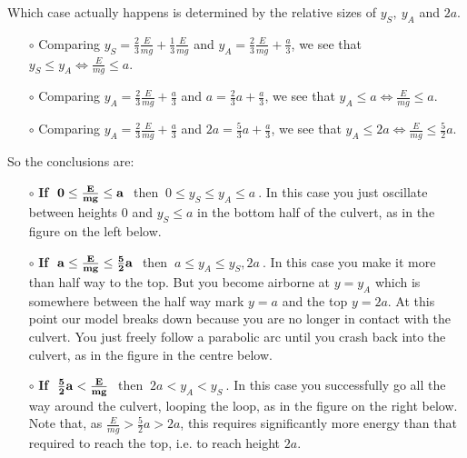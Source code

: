 Which case actually happens is determined by the relative sizes of $y_S,\ y_A$ and $2a$.
\begin{itemize}\itemsep1pt \parskip0pt  %
\item[$\circ$]
Comparing 
$y_S=\frac{2}{3}\frac{E}{mg}+\frac{1}{3}\frac{E}{mg}$ and
$y_A=\frac{2}{3}\frac{E}{mg}+\frac{a}{3}$, we see that
$y_S\le y_A\iff \frac{E}{mg}\le a $.

\item[$\circ$] Comparing 
$y_A=\frac{2}{3}\frac{E}{mg}+\frac{a}{3}$ and
$a=\frac{2}{3}a+\frac{a}{3}$, we see that
$y_A\le a\iff \frac{E}{mg}\le a$.


\item[$\circ$] 
Comparing 
$y_A=\frac{2}{3}\frac{E}{mg}+\frac{a}{3}$ and
$2a=\frac{5}{3}a+\frac{a}{3}$, we see that
$y_A\le 2a\iff \frac{E}{mg}\le \frac{5}{2}a$.

\end{itemize}
So the conclusions are:
\begin{itemize}\itemsep5pt \parskip0pt  %
\item[$\circ$]
{\bf If}  $\ {\bf 0\le\frac{E}{mg}\le a}\ $ then 
           $\ 0\le y_S\le y_A\le a\ $. 
In this case you just oscillate between heights 0 and $y_S\le a$ in 
the bottom half of the culvert, as in the figure on the left below.

\item[$\circ$]{
\bf If} $\ {\bf a\le\frac{E}{mg}\le \frac{5}{2}a}\ $ then 
$\ a\le y_A\le y_S,2a\ $.
In this case you make it more than half way to the top. But you 
become airborne at $y=y_A$ which is somewhere between the half way mark 
$y=a$ and the top $y=2a$. 
At this point our model breaks down because you are no longer in 
contact with the culvert. You just freely follow a parabolic arc until 
you crash back into the culvert, as in the figure in the centre below.

\item[$\circ$]
{\bf If} $\ {\bf \frac{5}{2}a < \frac{E}{mg}}\ $ then 
$\ 2a < y_A < y_S\ $.
In this case you
successfully go all the way around the culvert, looping  the loop,
as in the figure on the right below. Note that, as 
$\frac{E}{mg} > \frac{5}{2}a >2a$,  this requires significantly
more energy than that required to reach the top, i.e. to reach height $2a$.
\end{itemize}

